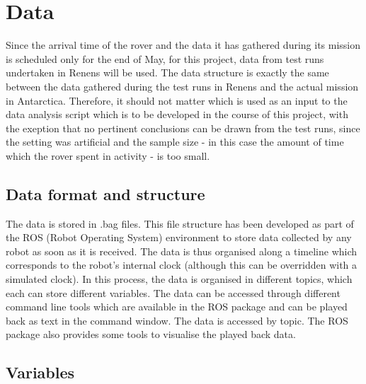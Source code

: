 \documentclass[11pt, UKenglish]{report}
\begin{document}
{%

\section*{Data}

Since the arrival time of the rover and the data it has gathered during its mission is scheduled only for the end of May, for this project, data from test runs undertaken in Renens will be used. The data structure is exactly the same between the data gathered during the test runs in Renens and the actual mission in Antarctica. Therefore, it should not matter which is used as an input to the data analysis script which is to be developed in the course of this project, with the exeption that no pertinent conclusions can be drawn from the test runs, since the setting was artificial and the sample size - in this case the amount of time which the rover spent in activity - is too small.

\subsection*{Data format and structure}

The data is stored in .bag files. This file structure has been developed as part of the ROS (Robot Operating System) environment to store data collected by any robot as soon as it is received. The data is thus organised along a timeline which corresponds to the robot's internal clock (although this can be overridden with a simulated clock). In this process, the data is organised in different topics, which each can store different variables. The data can be accessed through different command line tools which are available in the ROS package and can be played back as text in the command window. The data is accessed by topic. The ROS package also provides some tools to visualise the played back data.

\subsection*{Variables}

}
\end{document}
